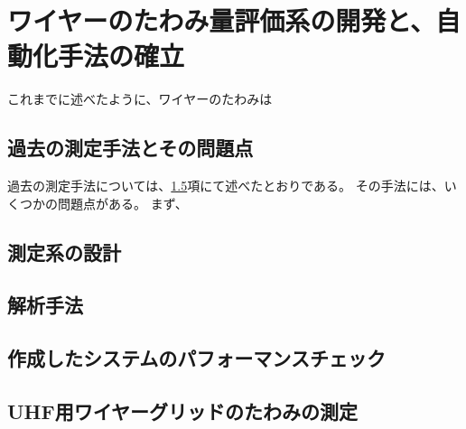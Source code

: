 \documentclass[../../main.tex]{subfiles}
\begin{document}
\chapter{ワイヤーのたわみ量評価系の開発と、自動化手法の確立}
\label{chap:wiresag}
これまでに述べたように、ワイヤーのたわみは

\section{過去の測定手法とその問題点}
過去の測定手法については、\ref{}項にて述べたとおりである。
その手法には、いくつかの問題点がある。
まず、


\section{測定系の設計}

\section{解析手法}

\section{作成したシステムのパフォーマンスチェック}

\section{UHF用ワイヤーグリッドのたわみの測定}
\end{document}
